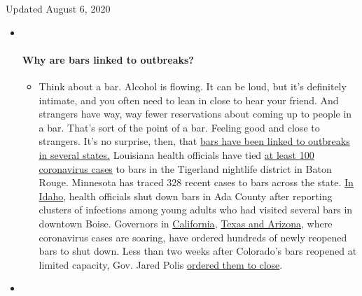 Updated August 6, 2020

\begin{itemize}
\item ~
  \hypertarget{why-are-bars-linked-to-outbreaks}{%
  \paragraph{Why are bars linked to
  outbreaks?}\label{why-are-bars-linked-to-outbreaks}}

  \begin{itemize}
  \tightlist
  \item
    Think about a bar. Alcohol is flowing. It can be loud, but it's
    definitely intimate, and you often need to lean in close to hear
    your friend. And strangers have way, way fewer reservations about
    coming up to people in a bar. That's sort of the point of a bar.
    Feeling good and close to strangers. It's no surprise, then, that
    \href{https://www.nytimes.com/2020/07/02/us/coronavirus-bars.html?action=click\&pgtype=Article\&state=default\&region=MAIN_CONTENT_3\&context=storylines_faq}{bars
    have been linked to outbreaks in several states.} Louisiana health
    officials have tied
    \href{https://www.nytimes.com/2020/06/22/us/new-coronavirus-phase.html?action=click\&pgtype=Article\&state=default\&region=MAIN_CONTENT_3\&context=storylines_faq}{at
    least 100 coronavirus cases} to bars in the Tigerland nightlife
    district in Baton Rouge. Minnesota has traced 328 recent cases to
    bars across the state.
    \href{https://www.boisestatepublicradio.org/post/bars-large-venues-close-ada-county-after-surge-coronavirus-prompts-rollback\#stream/0}{In
    Idaho}, health officials shut down bars in Ada County after
    reporting clusters of infections among young adults who had visited
    several bars in downtown Boise. Governors in
    \href{https://www.nytimes.com/2020/07/01/us/california-coronavirus-reopening.html?action=click\&pgtype=Article\&state=default\&region=MAIN_CONTENT_3\&context=storylines_faq}{California},
    \href{https://www.nytimes.com/2020/06/14/us/coronavirus-united-states.html?action=click\&pgtype=Article\&state=default\&region=MAIN_CONTENT_3\&context=storylines_faq}{Texas
    and Arizona}, where coronavirus cases are soaring, have ordered
    hundreds of newly reopened bars to shut down. Less than two weeks
    after Colorado's bars reopened at limited capacity, Gov. Jared Polis
    \href{https://www.denverpost.com/2020/06/30/colorado-bars-closed-coronavirus/}{ordered
    them to close}.
  \end{itemize}
\item ~
  \hypertarget{i-have-antibodies-am-i-now-immune}{%
}
\end{itemize}
